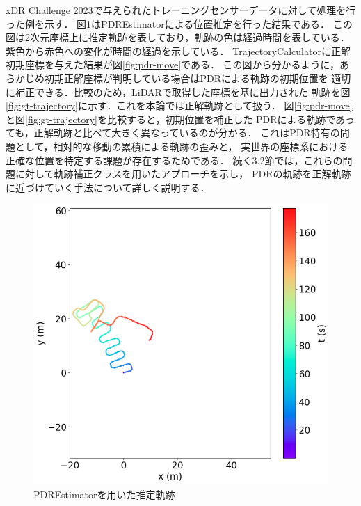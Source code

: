 xDR Challenge 2023で与えられたトレーニングセンサーデータに対して処理を行った例を示す．
図\ref{fig:pdr}はPDREstimatorによる位置推定を行った結果である．
この図は2次元座標上に推定軌跡を表しており，軌跡の色は経過時間を表している．
紫色から赤色への変化が時間の経過を示している．
TrajectoryCalculatorに正解初期座標を与えた結果が図\ref{fig:pdr-move}である．
この図から分かるように，あらかじめ初期正解座標が判明している場合はPDRによる軌跡の初期位置を
適切に補正できる．比較のため，LiDARで取得した座標を基に出力された
軌跡を図\ref{fig:gt-trajectory}に示す．これを本論では正解軌跡として扱う．
図\ref{fig:pdr-move}と図\ref*{fig:gt-trajectory}を比較すると，初期位置を補正した
PDRによる軌跡であっても，正解軌跡と比べて大きく異なっているのが分かる．
これはPDR特有の問題として，相対的な移動の累積による軌跡の歪みと，
実世界の座標系における正確な位置を特定する課題が存在するためである．
続く3.2節では，これらの問題に対して軌跡補正クラスを用いたアプローチを示し，
PDRの軌跡を正解軌跡に近づけていく手法について詳しく説明する．



\begin{figure}[H]
    \centering
    \includegraphics[width=\linewidth]{../image/pdr.jpg}
    \caption{PDREstimatorを用いた推定軌跡}    \label{fig:pdr}
\end{figure}

